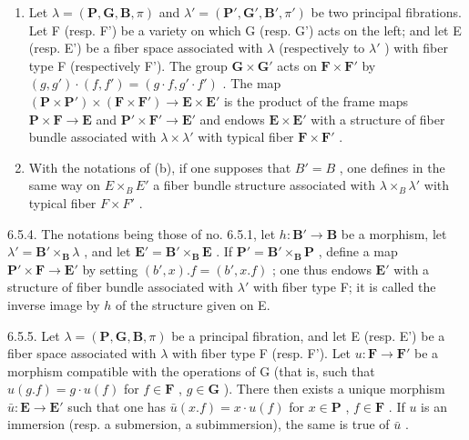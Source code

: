 \begin{enumerate}
\def\labelenumi{(\alph{enumi})}
\setcounter{enumi}{1}
\item
  Let \(\lambda = (\mathbf{P},\mathbf{G},\mathbf{B},\pi)\) and \(\lambda' = (\mathbf{P}',\mathbf{G}',\mathbf{B}',\pi')\) be two principal fibrations. Let F (resp. F') be a variety on which G (resp. G') acts on the left; and let E (resp. E') be a fiber space associated with \(\lambda\) (respectively to \(\lambda'\) ) with fiber type F (respectively F'). The group \(\mathbf{G} \times \mathbf{G}'\) acts on \(\mathbf{F} \times \mathbf{F}'\) by \((g, g') \cdot (f, f') = (g \cdot f, g' \cdot f')\) . The map \((\mathbf{P} \times \mathbf{P}') \times (\mathbf{F} \times \mathbf{F}') \to \mathbf{E} \times \mathbf{E}'\) is the product of the frame maps \(\mathbf{P} \times \mathbf{F} \to \mathbf{E}\) and \(\mathbf{P}' \times \mathbf{F}' \to \mathbf{E}'\) and endows \(\mathbf{E} \times \mathbf{E}'\) with a structure of fiber bundle associated with \(\lambda \times \lambda'\) with typical fiber \(\mathbf{F} \times \mathbf{F}'\) .
\item
  With the notations of (b), if one supposes that \(B' = B\) , one defines in the same way on \(E \times_{B} E'\) a fiber bundle structure associated with \(\lambda \times_{B} \lambda'\) with typical fiber \(F \times F'\) .
\end{enumerate}

6.5.4. The notations being those of no. 6.5.1, let \(h: \mathbf{B}' \to \mathbf{B}\) be a morphism, let \(\lambda' = \mathbf{B}' \times_{\mathbf{B}} \lambda\) , and let \(\mathbf{E}' = \mathbf{B}' \times_{\mathbf{B}} \mathbf{E}\) . If \(\mathbf{P}' = \mathbf{B}' \times_{\mathbf{B}} \mathbf{P}\) , define a map \(\mathbf{P}' \times \mathbf{F} \to \mathbf{E}'\) by setting \((b', x).f = (b', x.f)\) ; one thus endows \(\mathbf{E}'\) with a structure of fiber bundle associated with \(\lambda'\) with fiber type F; it is called the inverse image by \(h\) of the structure given on E.

6.5.5. Let \(\lambda = (\mathbf{P}, \mathbf{G}, \mathbf{B}, \pi)\) be a principal fibration, and let E (resp. E') be a fiber space associated with \(\lambda\) with fiber type F (resp. F'). Let \(u: \mathbf{F} \to \mathbf{F}'\) be a morphism compatible with the operations of G (that is, such that \(u(g.f) = g \cdot u(f)\) for \(f \in \mathbf{F}\) , \(g \in \mathbf{G}\) ). There then exists a unique morphism \(\bar{u}: \mathbf{E} \to \mathbf{E}'\) such that one has \(\bar{u}(x.f) = x \cdot u(f)\) for \(x \in \mathbf{P}\) , \(f \in \mathbf{F}\) . If \(u\) is an immersion (resp. a submersion, a subimmersion), the same is true of \(\bar{u}\) .

